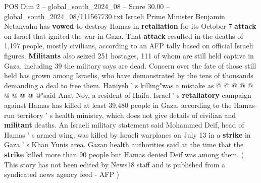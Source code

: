 \begin{textsample}{POS Dim 2 – global\_south\_2024\_08 – Score 30.00 – global\_south\_2024\_08/111567730.txt}
Israeli Prime Minister Benjamin Netanyahu has \textbf{vowed} to destroy Hamas in \textbf{retaliation} for its October 7 \textbf{attack} on Israel that ignited the war in Gaza.
That \textbf{attack} resulted in the deaths of 1,197 people, mostly civilians, according to an AFP tally based on official Israeli figures. \textbf{Militants} also seized 251 hostages, 111 of whom are still held captive in Gaza, including 39 the military says are dead.
Concern over the fate of those still held has grown among Israelis, who have demonstrated by the tens of thousands demanding a deal to free them.
Haniyeh ' s killing"was a mistake as @ @ @ @ @ @ @ @ @ @"said Anat Noy, a resident of Haifa.
Israel ' s \textbf{retaliatory} campaign against Hamas has killed at least 39,480 people in Gaza, according to the Hamas-run territory ' s health ministry, which does not give details of civilian and \textbf{militant} deaths.
An Israeli military statement said Mohammed Deif, head of Hamas ' s armed wing, was killed by Israeli warplanes on July 13 in a \textbf{strike} in Gaza ' s Khan Yunis area.
Gazan health authorities said at the time that the \textbf{strike} killed more than 90 people but Hamas denied Deif was among them. ( This story has not been edited by News18 staff and is published from a syndicated news agency feed - AFP )

\end{textsample}
